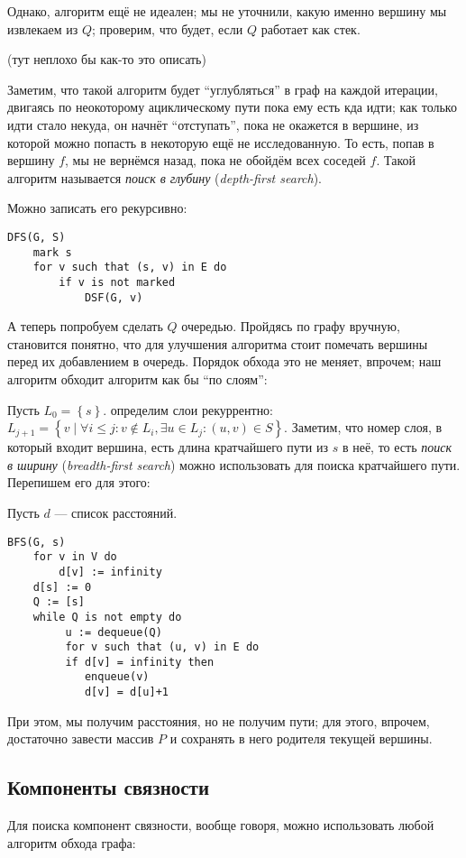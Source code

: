 Однако, алгоритм ещё не идеален; мы не уточнили, какую именно вершину мы извлекаем из $Q$; проверим, что будет, если $Q$ работает как стек.

(тут неплохо бы как-то это описать)

Заметим, что такой алгоритм будет ``углубляться'' в граф на каждой итерации, двигаясь по неокоторому ациклическому пути пока ему есть кда идти; как только идти стало некуда, он начнёт ``отступать'', пока не окажется в вершине, из которой можно попасть в некоторую ещё не исследованную. То есть, попав в вершину $f$, мы не вернёмся назад, пока не обойдём всех соседей $f$. Такой алгоритм называется \emph{поиск в глубину} (\emph{depth-first search}).

Можно записать его рекурсивно:

\begin{lstlisting}
DFS(G, S)
    mark s
    for v such that (s, v) in E do
        if v is not marked
            DSF(G, v)
\end{lstlisting}

А теперь попробуем сделать $Q$ очередью. Пройдясь по графу вручную, становится понятно, что для улучшения алгоритма стоит помечать вершины перед их добавлением в очередь. Порядок обхода это не меняет, впрочем; наш алгоритм обходит алгоритм как бы ``по слоям'':

Пусть $L_0 = \left\{ s \right\}$. определим слои рекуррентно: $L_{j+1} = \left\{ v\mid \forall i \leqslant j: v\not\in L_i, \exists u \in L_j:(u, v) \in S \right\}$. Заметим, что номер слоя, в который входит вершина, есть длина кратчайшего пути из $s$ в неё, то есть \emph{поиск в ширину} (\emph{breadth-first search}) можно использовать для поиска кратчайшего пути. Перепишем его для этого:

Пусть $d$ --- список расстояний.
\begin{lstlisting}
BFS(G, s)
    for v in V do
        d[v] := infinity
    d[s] := 0
    Q := [s]
    while Q is not empty do
         u := dequeue(Q)
         for v such that (u, v) in E do
         if d[v] = infinity then
            enqueue(v)
            d[v] = d[u]+1
\end{lstlisting}

При этом, мы получим расстояния, но не получим пути; для этого, впрочем, достаточно завести массив $P$ и сохранять в него родителя текущей вершины.

\subsection{Компоненты связности}

Для поиска компонент связности, вообще говоря, можно использовать любой алгоритм обхода графа:

